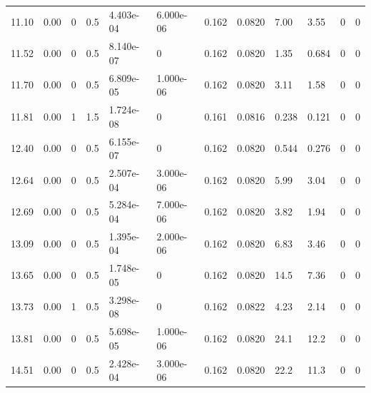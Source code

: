 \documentclass[preview]{standalone}
\begin{document}
{{\begin{tabular}{L{1.2cm}C{1.2cm} C{0.3cm}C{0.5cm} C{1.4cm}C{1.4cm} C{1.4cm}C{1.4cm} C{1.6cm}C{1.6cm} C{1.6cm}C{1.6cm}}
  11.10  &  0.00  & 0     & 0.5 &  4.403e-04  & 6.000e-06  &  0.162&   0.0820& 7.00 & 3.55   &  0 & 0  \\ 
  11.52  &  0.00  & 0     & 0.5 &  8.140e-07  & 0  &  0.162&   0.0820& 1.35 & 0.684   &  0 & 0  \\ 
  11.70  &  0.00  & 0     & 0.5 &  6.809e-05  & 1.000e-06  &  0.162&   0.0820& 3.11 & 1.58   &  0 & 0  \\ 
  11.81  &  0.00  & 1     & 1.5 &  1.724e-08  & 0  &  0.161&   0.0816& 0.238 & 0.121   &  0 & 0  \\ 
  12.40  &  0.00  & 0     & 0.5 &  6.155e-07  & 0  &  0.162&   0.0820& 0.544 & 0.276   &  0 & 0  \\ 
  12.64  &  0.00  & 0     & 0.5 &  2.507e-04  & 3.000e-06  &  0.162&   0.0820& 5.99 & 3.04   &  0 & 0  \\ 
  12.69  &  0.00  & 0     & 0.5 &  5.284e-04  & 7.000e-06  &  0.162&   0.0820& 3.82 & 1.94   &  0 & 0  \\ 
  13.09  &  0.00  & 0     & 0.5 &  1.395e-04  & 2.000e-06  &  0.162&   0.0820& 6.83 & 3.46   &  0 & 0  \\ 
  13.65  &  0.00  & 0     & 0.5 &  1.748e-05  & 0  &  0.162&   0.0820& 14.5 & 7.36   &  0 & 0  \\ 
  13.73  &  0.00  & 1     & 0.5 &  3.298e-08  & 0  &  0.162&   0.0822& 4.23 & 2.14   &  0 & 0  \\ 
  13.81  &  0.00  & 0     & 0.5 &  5.698e-05  & 1.000e-06  &  0.162&   0.0820& 24.1 & 12.2   &  0 & 0  \\ 
  14.51  &  0.00  & 0     & 0.5 &  2.428e-04  & 3.000e-06  &  0.162&   0.0820& 22.2 & 11.3   &  0 & 0  \\ 
\hline 
\end{tabular} 

}}
\end{document}
